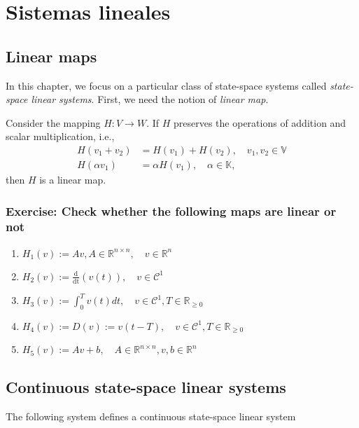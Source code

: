 \chapter{Sistemas lineales}

\section{Linear maps}

In this chapter, we focus on a particular class of state-space systems called \emph{state-space linear systems}. First, we need the notion of \emph{linear map}.

\begin{definition} Consider the mapping $H: V \to W$. If $H$ preserves the operations of addition and scalar multiplication, i.e.,
\begin{align}
	H(v_1+v_2) &= H(v_1) + H(v_2), \quad v_1, v_2\in\mathbb{V} \nonumber \\
	H(\alpha v_1) &= \alpha H(v_1), \quad \alpha\in\mathbb{K} \nonumber,
\end{align}
then $H$ is a linear map.
\end{definition}

\subsection{Exercise: Check whether the following maps are linear or not}

\begin{enumerate}
	\item $H_1(v) := Av, A\in\mathbb{R}^{n\times n}, \quad v\in\mathbb{R}^n$
	\item $H_2(v) := \frac{\mathrm{d}}{\mathrm{dt}}(v(t)), \quad v\in\mathcal{C}^1$
	\item $H_3(v) := \int_0^T v(t) dt, \quad v\in\mathcal{C}^1, T\in\mathbb{R}_{\geq 0}$
	\item $H_4(v) := D(v) := v(t - T), \quad v\in\mathcal{C}^1, T\in\mathbb{R}_{\geq 0}$
	\item $H_5(v) := Av + b, \quad A\in\mathbb{R}^{n\times n}, v,b\in\mathbb{R}^n$
\end{enumerate}

\section{Continuous state-space linear systems}

The following system defines a continuous state-space linear system

